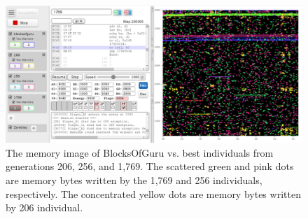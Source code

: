 \documentclass[dvipsnames, format=sigconf]{acmart}
\begin{document}
\begin{figure}
  \centering
    \includegraphics[width=\linewidth]{images/blocksofguru_generations_comparison_memory.png}
  \caption{The memory image of BlocksOfGuru vs. best individuals from generations 206, 256, and 1,769. The scattered green and pink dots are memory bytes written by the 1,769 and 256 individuals, respectively. The concentrated yellow dots are memory bytes written by 206 individual.}
  \label{fig:joinedgame}
\end{figure}
\end{document}
